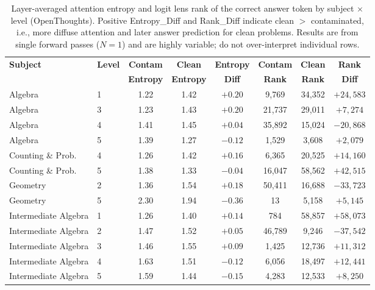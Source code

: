 \documentclass{article} %
\begin{document}
\begin{table}[h]
\centering
\small
\caption{Layer-averaged attention entropy and logit lens rank of the correct answer token by subject $\times$ level (OpenThoughts). Positive Entropy\_Diff and Rank\_Diff indicate clean $>$ contaminated, i.e., more diffuse attention and later answer prediction for clean problems. Results are from single forward passes ($N=1$) and are highly variable; do not over-interpret individual rows.}
\label{tab:mech_full}
\begin{tabular}{llcccccc}
\toprule
\textbf{Subject} & \textbf{Level} & \textbf{Contam} & \textbf{Clean} & \textbf{Entropy} & \textbf{Contam} & \textbf{Clean} & \textbf{Rank} \\
& & \textbf{Entropy} & \textbf{Entropy} & \textbf{Diff} & \textbf{Rank} & \textbf{Rank} & \textbf{Diff} \\
\midrule
Algebra                  & 1 & 1.22 & 1.42 & $+0.20$ & 9{,}769  & 34{,}352 & $+24{,}583$ \\
Algebra                  & 3 & 1.23 & 1.43 & $+0.20$ & 21{,}737 & 29{,}011 & $+7{,}274$ \\
Algebra                  & 4 & 1.41 & 1.45 & $+0.04$ & 35{,}892 & 15{,}024 & $-20{,}868$ \\
Algebra                  & 5 & 1.39 & 1.27 & $-0.12$ & 1{,}529  & 3{,}608  & $+2{,}079$ \\
Counting \& Prob.        & 4 & 1.26 & 1.42 & $+0.16$ & 6{,}365  & 20{,}525 & $+14{,}160$ \\
Counting \& Prob.        & 5 & 1.38 & 1.33 & $-0.04$ & 16{,}047 & 58{,}562 & $+42{,}515$ \\
Geometry                 & 2 & 1.36 & 1.54 & $+0.18$ & 50{,}411 & 16{,}688 & $-33{,}723$ \\
Geometry                 & 5 & 2.30 & 1.94 & $-0.36$ & 13       & 5{,}158  & $+5{,}145$ \\
Intermediate Algebra     & 1 & 1.26 & 1.40 & $+0.14$ & 784      & 58{,}857 & $+58{,}073$ \\
Intermediate Algebra     & 2 & 1.47 & 1.52 & $+0.05$ & 46{,}789 & 9{,}246  & $-37{,}542$ \\
Intermediate Algebra     & 3 & 1.46 & 1.55 & $+0.09$ & 1{,}425  & 12{,}736 & $+11{,}312$ \\
Intermediate Algebra     & 4 & 1.63 & 1.51 & $-0.12$ & 6{,}056  & 18{,}497 & $+12{,}441$ \\
Intermediate Algebra     & 5 & 1.59 & 1.44 & $-0.15$ & 4{,}283  & 12{,}533 & $+8{,}250$ \\

\end{tabular}
\end{table}
\end{document}
